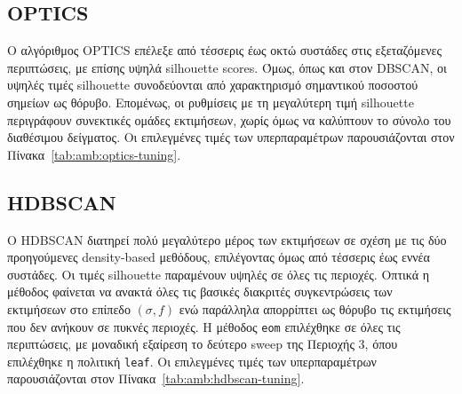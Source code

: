 \subsection{OPTICS}

Ο αλγόριθμος OPTICS επέλεξε από τέσσερις έως οκτώ συστάδες στις εξεταζόμενες περιπτώσεις, με επίσης υψηλά silhouette scores. Όμως, όπως
και στον DBSCAN, οι υψηλές τιμές silhouette συνοδεύονται από χαρακτηρισμό σημαντικού ποσοστού
σημείων ως θόρυβο. Επομένως, οι ρυθμίσεις με τη μεγαλύτερη τιμή silhouette
περιγράφουν συνεκτικές ομάδες εκτιμήσεων, χωρίς όμως να καλύπτουν το
σύνολο του διαθέσιμου δείγματος. Οι επιλεγμένες τιμές των υπερπαραμέτρων παρουσιάζονται στον Πίνακα~\ref{tab:amb:optics-tuning}.

\begin{table}[htbp]
    \centering
    \caption{Επιλεγμένες ρυθμίσεις OPTICS.}
    \label{tab:amb:optics-tuning}
\end{table}

\subsection{HDBSCAN}

Ο HDBSCAN διατηρεί πολύ μεγαλύτερο μέρος των εκτιμήσεων σε σχέση με τις δύο
προηγούμενες density-based μεθόδους, επιλέγοντας όμως από τέσσερις έως εννέα
συστάδες. Οι τιμές silhouette παραμένουν υψηλές σε όλες τις περιοχές. Οπτικά η μέθοδος φαίνεται να ανακτά όλες τις βασικές διακριτές συγκεντρώσεις των εκτιμήσεων στο επίπεδο $(\sigma,f)$ ενώ παράλληλα απορρίπτει ως θόρυβο τις εκτιμήσεις που δεν ανήκουν σε πυκνές περιοχές. Η μέθοδος \texttt{eom} επιλέχθηκε σε όλες τις περιπτώσεις, με μοναδική εξαίρεση το δεύτερο sweep της Περιοχής 3, όπου επιλέχθηκε η πολιτική \texttt{leaf}. Οι επιλεγμένες τιμές των υπερπαραμέτρων παρουσιάζονται στον Πίνακα~\ref{tab:amb:hdbscan-tuning}.

